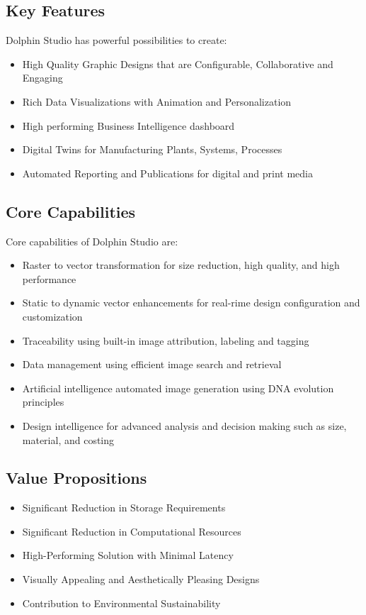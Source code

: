 \documentclass{amm-pst-report}
\begin{document}
\subsection{Key Features}
Dolphin Studio has powerful possibilities to create:
\begin{itemize}[nosep]
\item High Quality Graphic Designs that are Configurable, Collaborative and Engaging
\item Rich Data Visualizations with Animation and Personalization
\item High performing Business Intelligence dashboard
\item Digital Twins for Manufacturing Plants, Systems, Processes
\item Automated Reporting and Publications for digital and print media
\end{itemize}


\subsection{Core Capabilities}
Core capabilities of Dolphin Studio are:
\begin{itemize}[nosep]
\item Raster to vector transformation for size reduction, high quality, and high performance
\item Static to dynamic vector enhancements for real-rime design configuration and customization
\item Traceability using built-in image attribution, labeling and tagging
\item Data management using efficient image search and retrieval
\item Artificial intelligence automated image generation using DNA evolution principles
\item Design intelligence for advanced analysis and decision making such as size, material, and costing
\end{itemize}

\subsection{Value Propositions}
\begin{itemize}
\item Significant Reduction in Storage Requirements
\item Significant Reduction in Computational Resources
\item High-Performing Solution with Minimal Latency
\item Visually Appealing and Aesthetically Pleasing Designs
\item Contribution to Environmental Sustainability
\end{itemize}
\end{document}
